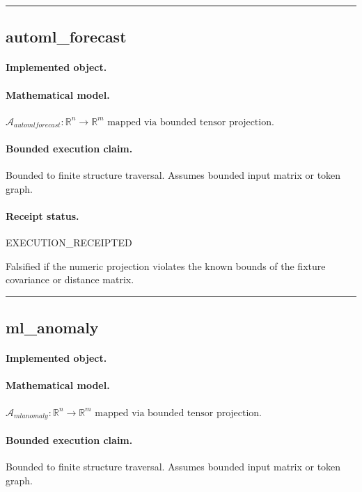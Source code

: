 \vspace{1em}\hrule\vspace{1em}
\subsection{automl\_forecast}
\paragraph{Implemented object.} 
\paragraph{Mathematical model.} $\mathcal{A}_{automlforecast} : \mathbb{R}^{n} \to \mathbb{R}^{m} \text{ mapped via bounded tensor projection}.$
\paragraph{Bounded execution claim.} Bounded to finite structure traversal. Assumes bounded input matrix or token graph.
\paragraph{Receipt status.} EXECUTION\_RECEIPTED
\begin{falsifier}
Falsified if the numeric projection violates the known bounds of the fixture covariance or distance matrix.
\end{falsifier}

\vspace{1em}\hrule\vspace{1em}
\subsection{ml\_anomaly}
\paragraph{Implemented object.} 
\paragraph{Mathematical model.} $\mathcal{A}_{mlanomaly} : \mathbb{R}^{n} \to \mathbb{R}^{m} \text{ mapped via bounded tensor projection}.$
\paragraph{Bounded execution claim.} Bounded to finite structure traversal. Assumes bounded input matrix or token graph.
